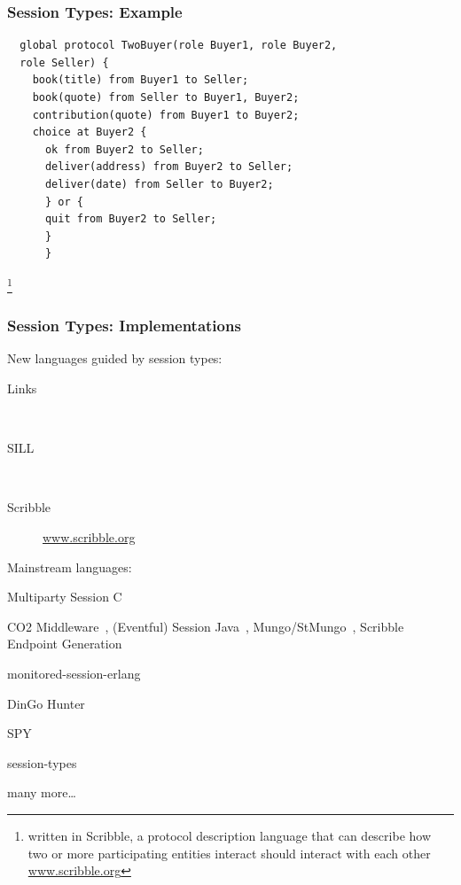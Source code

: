 \begin{frame}[fragile]\frametitle{Session Types: Example}
  \begin{lstlisting}
  global protocol TwoBuyer(role Buyer1, role Buyer2,
  role Seller) {
    book(title) from Buyer1 to Seller;
    book(quote) from Seller to Buyer1, Buyer2;
    contribution(quote) from Buyer1 to Buyer2;
    choice at Buyer2 {
      ok from Buyer2 to Seller;
      deliver(address) from Buyer2 to Seller;
      deliver(date) from Seller to Buyer2;
      } or {
      quit from Buyer2 to Seller;
      }
      }
  \end{lstlisting}\footnote{written in Scribble, a protocol description language that can describe how two or more participating entities interact should interact with each other \url{www.scribble.org}}
  ~\cite{honda2008multiparty}
\end{frame}

\begin{frame}\frametitle{Session Types: Implementations}
New languages guided by session types:
\begin{description}
\item [Links]~\cite{lindleylightweight}
\item [SILL]~\cite{pfenning2015}
\item [Scribble] \url{www.scribble.org}
\end{description}

Mainstream languages:
\begin{description}
\item [C] Multiparty Session C~\cite{ng12}
\item [Java] CO2 Middleware~\cite{Bartoletti2015}, (Eventful) Session Java~\cite{hu08}, Mungo/StMungo~\cite{kouzapas16}, Scribble Endpoint Generation~\cite{hu16}
\item [Erlang] monitored-session-erlang~\cite{fowler}
\item [Go] DinGo Hunter~\cite{dingo}
\item [Python] SPY~\cite{Neykova2013}
\item [Rust] session-types~\cite{rust}
\item many more\ldots
\end{description}

\end{frame}
